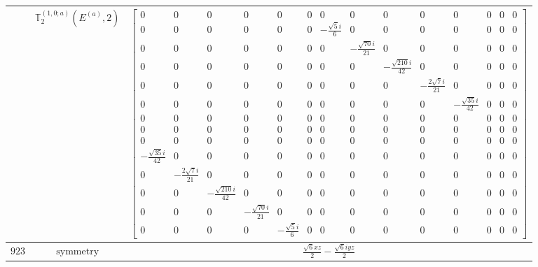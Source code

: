\documentclass[fleqn,8pt,landscape]{jsarticle}
\begin{document}
\begin{longtable}{ccc}
$  $ & $ \mathbb{T}_{2}^{(1,0;a)}(E^{(a)},2) $ & $ \begin{bmatrix} 0 & 0 & 0 & 0 & 0 & 0 & 0 & 0 & 0 & 0 & 0 & 0 & 0 & 0 \\ 0 & 0 & 0 & 0 & 0 & 0 & - \frac{\sqrt{5} i}{6} & 0 & 0 & 0 & 0 & 0 & 0 & 0 \\ 0 & 0 & 0 & 0 & 0 & 0 & 0 & - \frac{\sqrt{70} i}{21} & 0 & 0 & 0 & 0 & 0 & 0 \\ 0 & 0 & 0 & 0 & 0 & 0 & 0 & 0 & - \frac{\sqrt{210} i}{42} & 0 & 0 & 0 & 0 & 0 \\ 0 & 0 & 0 & 0 & 0 & 0 & 0 & 0 & 0 & - \frac{2 \sqrt{7} i}{21} & 0 & 0 & 0 & 0 \\ 0 & 0 & 0 & 0 & 0 & 0 & 0 & 0 & 0 & 0 & - \frac{\sqrt{35} i}{42} & 0 & 0 & 0 \\ 0 & 0 & 0 & 0 & 0 & 0 & 0 & 0 & 0 & 0 & 0 & 0 & 0 & 0 \\ 0 & 0 & 0 & 0 & 0 & 0 & 0 & 0 & 0 & 0 & 0 & 0 & 0 & 0 \\ 0 & 0 & 0 & 0 & 0 & 0 & 0 & 0 & 0 & 0 & 0 & 0 & 0 & 0 \\ - \frac{\sqrt{35} i}{42} & 0 & 0 & 0 & 0 & 0 & 0 & 0 & 0 & 0 & 0 & 0 & 0 & 0 \\ 0 & - \frac{2 \sqrt{7} i}{21} & 0 & 0 & 0 & 0 & 0 & 0 & 0 & 0 & 0 & 0 & 0 & 0 \\ 0 & 0 & - \frac{\sqrt{210} i}{42} & 0 & 0 & 0 & 0 & 0 & 0 & 0 & 0 & 0 & 0 & 0 \\ 0 & 0 & 0 & - \frac{\sqrt{70} i}{21} & 0 & 0 & 0 & 0 & 0 & 0 & 0 & 0 & 0 & 0 \\ 0 & 0 & 0 & 0 & - \frac{\sqrt{5} i}{6} & 0 & 0 & 0 & 0 & 0 & 0 & 0 & 0 & 0 \end{bmatrix} $ \\ \hline
$ 923 $ & $ \text{symmetry} $ & $ \frac{\sqrt{6} x z}{2} - \frac{\sqrt{6} i y z}{2} $ \\

\end{longtable}
\end{document}
